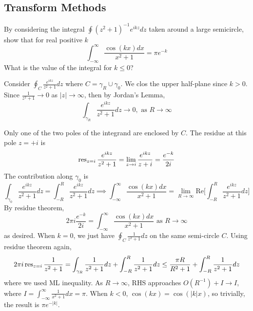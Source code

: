 \documentclass[a4paper]{article}
\begin{document}
\subsection*{Transform Methods}
\begin{qns}
By considering the integral
$\oint(z^2+1)^{-1}e^{ikz}dz$ taken around a large semicircle, show that for real positive $k$
$$\int_{-\infty}^\infty\frac{\cos(kx)dx}{x^2+1}=\pi e^{-k}$$
What is the value of the integral for $k\leq 0$?
\end{qns}
\begin{ans}
Consider $\oint_C\frac{e^{ikz}}{z^2+1}dz$ where $C=\gamma_R\cup\gamma_0$. We clos the upper half-plane since $k>0$. Since $\frac{1}{z^2+1}\rightarrow 0$ as $|z|\rightarrow\infty$, then by Jordan's Lemma,
$$\int_{\gamma_R}\frac{e^{ikz}}{z^2+1}dz\rightarrow 0,\text{ as }R\rightarrow\infty$$
\begin{center}
  \end{center}
Only one of the two poles of the integrand are enclosed by $C$. The residue at this pole $z=+i$ is
$$\operatorname{res}_{z=i}\frac{e^{ikz}}{z^2+1}=\lim_{z\rightarrow i}\frac{e^{ikz}}{z+i}=\frac{e^{-k}}{2i}$$
The contribution along $\gamma_0$ is
$$\int_{\gamma_0}\frac{e^{ikz}}{z^2+1}dz=\int_{-R}^R\frac{e^{ikz}}{z^2+1}dz\implies\int_{-\infty}^\infty\frac{\cos(kx)dx}{x^2+1}=\lim_{R\rightarrow\infty}\text{Re}\bigg[\int_{-R}^R\frac{e^{ikz}}{z^2+1}dz\bigg]$$
By residue theorem,
$$2\pi i\frac{e^{-k}}{2i}=\int_{-\infty}^\infty\frac{\cos(kx)dx}{x^2+1}\text{ as }R\rightarrow\infty$$
as desired. When $k=0$, we just have $\oint_C\frac{1}{z^2+1}dz$ on the same semi-circle $C$. Using residue theorem again,
$$2\pi i\operatorname{res}_{z=i}\frac{1}{z^2+1}=\int_{\gamma_R}\frac{1}{z^2+1}dz+\int_{-R}^R\frac{1}{z^2+1}dz\leq\frac{\pi R}{R^2+1}+\int_{-R}^R\frac{1}{z^2+1}dz$$
where we used ML inequality. As $R\rightarrow\infty$, RHS approaches $O(R^{-1})+I\rightarrow I$, where $I=\int_{-\infty}^\infty\frac{1}{x^2+1}dx=\pi$. When $k<0$, $\cos(kx)=\cos(|k|x)$, so trivially, the result is $\pi e^{-|k|}$.
\end{ans}
\end{document}
